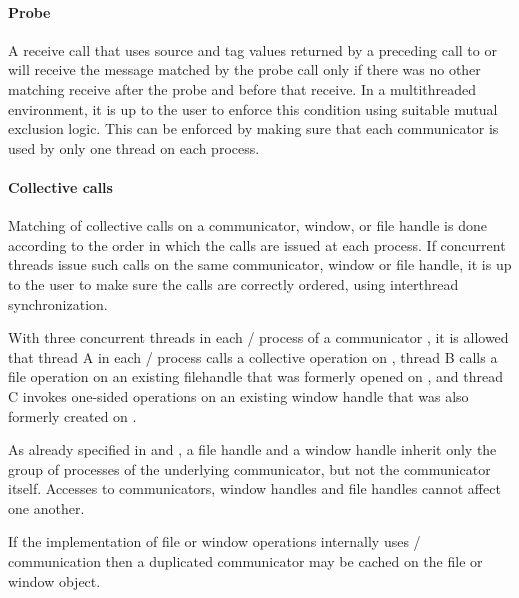 \paragraph{Probe}
A receive call that uses source and tag values returned by a preceding
call to  or  will receive the
message matched by the probe call only if there was no other matching
receive
after the probe and before that receive.  In a multithreaded
environment, it is up to the user to enforce this condition using
suitable mutual exclusion logic.
This can be enforced by
making sure that each communicator is used by only one thread on each
process.

\paragraph{Collective calls}

Matching of collective calls on a
communicator, window, or file handle is done according to the order in which the calls are issued
at each process.  If concurrent threads issue such calls on the same
communicator, window or file handle, it is up to
the user to make sure the calls are correctly ordered, using
interthread synchronization.
\begin{users}
  With three concurrent threads in each \MPI/ process of a communicator ,
  it is allowed that thread A in each \MPI/ process calls a collective 
  operation on , thread B calls a file operation on an existing
  filehandle that was formerly opened on , and thread C invokes one-sided
  operations on an existing window handle that was also formerly created 
  on . 
\end{users}
\begin{rationale}
  As already specified in  and 
  , a file handle and
  a window handle inherit only the group of processes of the underlying
  communicator, but not the communicator itself. Accesses to communicators,
  window handles and file handles cannot affect one another.
\end{rationale}
\begin{implementors}
  If the implementation of file or window operations internally 
  uses \MPI/ communication then a duplicated communicator may be cached
  on the file or window object.  
\end{implementors}


